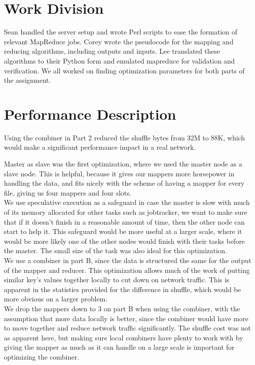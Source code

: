 \documentclass[14pt]{extarticle}
\begin{document}
\section{Work Division}
Sean handled the server setup and wrote Perl scripts to ease the formation of relevant MapReduce jobs.
Corey wrote the pseudocode for the mapping and reducing algorithms, including outputs and inputs.
Lee translated these algorithms to their Python form and emulated mapreduce for validation and verification. 
We all worked on finding optimization parameters for both parts of the assignment. 

\section{Performance Description}
Using the combiner in Part 2 reduced the shuffle bytes from 32M to 88K, which
would make a significant performance impact in a real network.

Master as slave was the first optimization, where we used the master node as a slave node.  This is helpful, because it gives our mappers more horsepower in handling the data, and fits nicely with the scheme of having a mapper for every file, giving us four mappers and four slots.\\ 

We use speculative execution as a safeguard in case the master is slow with much of its memory allocated for other tasks such as jobtracker, we want to make sure that if it doesn't finish in a reasonable amount of time, then the other node can start to help it.  This safeguard would be more useful at a larger scale, where it would be more likely one of the other nodes would finish with their tasks before the master.  The small size of the task was also ideal for this optimization. \\

We use a combiner in part B, since the data is structured the same for the output of the mapper and reducer.  This optimization allows much of the work of putting similar key's values together locally to cut down on network traffic.  This is apparent in the statistics provided for the difference in shuffle, which would be more obvious on a larger problem. 
\\

We drop the mappers down to 3 on part B when using the combiner, with the assumption that more data locally is better, since the combiner would have more to move together and reduce network traffic significantly.  The shuffle cost was not as apparent here, but making sure local combiners have plenty to work with by giving the mapper as much as it can handle on a large scale is important for optimizing the combiner.
\end{document}
